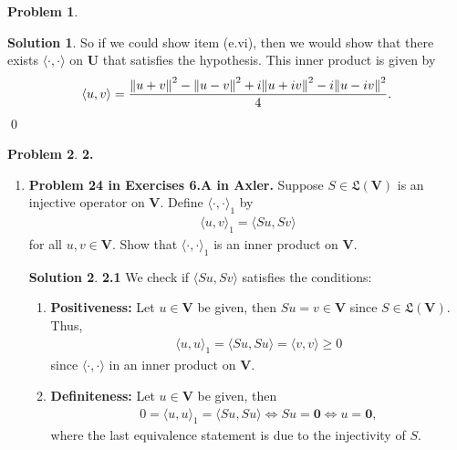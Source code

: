 \documentclass{article}
\theoremstyle{definition}
\newtheorem*{prob*}{Problem}
\newtheorem*{sln*}{Solution}
\newcommand{\V}{\mathbf{V}}
\newcommand{\U}{\mathbf{U}}
\newcommand{\LL}{\mathfrak{L}}
\newcommand{\la}{\langle}
\newcommand{\ra}{\rangle}
\begin{document}
\begin{prob*}
\begin{enumerate}
\begin{sln*}
			
			So if we could show item (e.vi), then we would show that there exists $\la \cdot,\cdot \ra$ on $\U$ that satisfies the hypothesis. This inner product is given by
			\begin{align*}
			\la u,v\ra = \frac{\norm{u+v}^2 - \norm{u-v}^2 +i\norm{u+iv}^2 - i\norm{u-iv}^2}{4}.
			\end{align*}\qed
		\end{sln*}
		
	\end{enumerate}
	
	
\end{prob*}


\newpage



\begin{prob*}\textbf{2.} 
	\begin{enumerate}
		\item \textbf{Problem 24 in Exercises 6.A in Axler.} Suppose $S \in \LL(\V)$ is an injective operator on $\V$. Define $\la \cdot , \cdot \ra_1$ by 
		\begin{align*}
		\la u , v\ra_1 = \la Su, Sv \ra
		\end{align*}  
		for all $u,v\in \V$. Show that $\la \cdot , \cdot \ra_1$ is an inner product on $\V$. 
		
		
		
		\begin{sln*}\textbf{2.1} 
			We check if $\la Su, Sv \ra$ satisfies the conditions:
			\begin{enumerate}
				\item \textbf{Positiveness: }Let $u \in \V$ be given, then $Su = v \in \V$ since $S \in \LL(\V)$. Thus,
				\begin{align*}
				\la u,u \ra_1 = \la Su ,Su \ra = \la v,v \ra \geq 0
				\end{align*}
				since $\la \cdot, \cdot \ra$ in an inner product on $\V$.
				
				\item \textbf{Definiteness: }Let $u\in \V$ be given, then
				\begin{align*}
				0 = \la u,u \ra_1 = \la Su ,Su \ra \iff Su = \mathbf{0} \iff u = \mathbf{0},
				\end{align*}
				where the last equivalence statement is due to the injectivity of $S$. 
				

\end{enumerate}
\end{sln*}
\end{enumerate}
\end{prob*}
\end{document}

